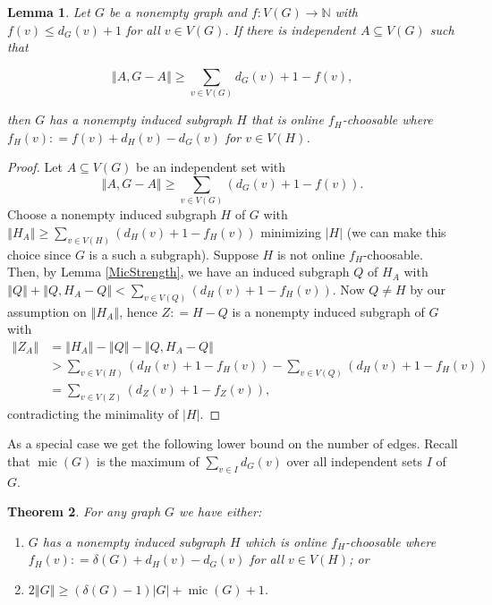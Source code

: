 \documentclass[12pt]{article}
\theoremstyle{plain}
\newtheorem{thm}{Theorem}[section]
\newtheorem{lem}[thm]{Lemma}
\theoremstyle{definition}
\theoremstyle{remark}
\newcommand{\IN}{\mathbb{N}}
\newcommand{\card}[1]{\left|#1\right|}
\newcommand{\size}[1]{\left\Vert#1\right\Vert}
\newcommand{\func}[3]{#1\colon #2 \rightarrow #3}
\newcommand{\parens}[1]{\left( #1 \right)}
\newcommand{\DefinedAs}{\mathrel{\mathop:}=}
\newcommand{\mic}{\operatorname{mic}}
\begin{document}
\begin{lem}\label{SecondStrengtheningMic}
	Let $G$ be a nonempty graph and $\func{f}{V(G)}{\IN}$ with $f(v) \le d_G(v) + 1$ for all $v \in V(G)$. If there is independent $A \subseteq V(G)$ such that
	
	\[\size{A, G-A} \ge  \sum_{v \in V(G)} d_G(v) + 1 - f(v),\]
	
	\noindent then $G$ has a nonempty induced subgraph $H$ that is online $f_H$-choosable where $f_H(v) \DefinedAs f(v) + d_H(v) - d_G(v)$ for $v \in V(H)$.
\end{lem}
\begin{proof}
	Let $A \subseteq V(G)$ be an independent set with 
	\[\size{A, G-A} \ge \sum_{v \in V(G)} \parens{d_G(v) + 1 - f(v)}.\] Choose a nonempty induced subgraph $H$ of $G$ with $\size{H_A} \ge \sum_{v \in V(H)} \parens{d_H(v) + 1 - f_H(v)}$ minimizing $\card{H}$ (we can make this choice since $G$ is a such a subgraph). Suppose $H$ is not online $f_H$-choosable. Then, by Lemma \ref{MicStrength}, we have an induced subgraph $Q$ of $H_A$ with $\size{Q} + \size{Q, H_A - Q} < \sum_{v \in V(Q)} \parens{d_H(v) + 1 - f_H(v)}$.  Now $Q \ne H$ by our assumption on $\size{H_A}$, hence $Z \DefinedAs H-Q$ is a nonempty induced subgraph of $G$ with 
	\begin{align*}
	\size{Z_A} &= \size{H_A} - \size{Q} - \size{Q, H_A - Q} \\ 
	&> \sum_{v \in V(H)} \parens{d_H(v) + 1 - f_H(v)} - \sum_{v \in V(Q)} \parens{d_H(v) + 1 - f_H(v)} \\
	&= \sum_{v \in V(Z)} \parens{d_Z(v) + 1 - f_Z(v)},
	\end{align*} contradicting the minimality of $\card{H}$.
\end{proof}

As a special case we get the following lower bound on the number of edges.  Recall that $\mic(G)$ is the maximum of $\sum_{v \in I} d_G(v)$ over all independent sets $I$ of $G$.

\begin{thm}\label{ConsantListMicStrength}
For any graph $G$ we have either:
\begin{enumerate}
\item $G$ has a nonempty induced subgraph $H$ which is online $f_H$-choosable where $f_H(v) \DefinedAs \delta(G) + d_H(v) - d_G(v)$ for all $v \in V(H)$; or
\item $2\size{G} \geq (\delta(G) - 1)\card{G} + \mic(G) + 1$.
\end{enumerate}
\end{thm}
\end{document}
